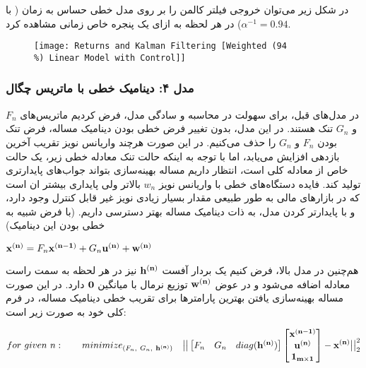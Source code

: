 \documentclass{scribe-cgenomics}
\begin{document}
\begin{نتیجه}
در شکل زیر می‌توان خروجی فیلتر کالمن را بر روی مدل خطی حساس به زمان ( با
$\alpha^{-1} = 0.94$)
در هر لحظه به ازای یک پنجره خاص زمانی مشاهده کرد.

\begin{figure}[h]
\texttt{[image: Returns and Kalman Filtering [Weighted (94\\\%) Linear Model with Control]]}
\centering
\end{figure}
\end{نتیجه}





\subsubsection{مدل ۴: دینامیک خطی با ماتریس چگال}
در مدل‌های قبل، برای سهولت در محاسبه و سادگی مدل، فرض کردیم ماتریس‌های
$F_n$
و
$G_n$
تنک هستند. در این مدل، بدون تغییر فرض خطی بودن دینامیک مساله، فرض تنک بودن
$F_n$
و
$G_n$
را حذف می‌کنیم. در این صورت هرچند واریانس نویز تقریب آخرین بازدهی افزایش می‌یابد، اما با توجه به اینکه حالت تنک معادله خطی زیر، یک حالت خاص از معادله کلی است، انتظار داریم مساله بهینه‌سازی بتواند جواب‌های پایدارتری تولید کند. فایده دستگاه‌های خطی با واریانس نویز
$w_n$
بالاتر ولی پایداری بیشتر ان است که در بازارهای مالی به طور طبیعی مقدار بسیار زیادی نویز غیر قابل کنترل وجود دارد، و با پایدارتر کردن مدل، به ذات دینامیک مساله بهتر دسترسی داریم. (با فرض شبیه به خطی بودن این دینامیک)

\begin{center}
$
\bold{x^{(n)}} = F_n\bold{x^{(n-1)}} + G_n\bold{u^{(n)}} + \bold{w^{(n)}}
$
\end{center}

هم‌چنین در مدل بالا، فرض کنیم یک بردار آفست
$\bold{h^{(n)}}$
نیز در هر لحظه به سمت راست معادله اضافه می‌شود و در عوض
$\bold{w^{(n)}}$
توزیع نرمال با میانگین
$\bold{0}$
دارد. در این صورت مساله بهینه‌سازی یافتن بهترین پارامترها برای تقریب خطی دینامیک مساله، در فرم کلی خود به صورت زیر است:

\begin{equation}
for\ given\ n:\qquad minimize_{(F_n,\ G_n,\ \bold{h^{(n)}})}\quad \big| \big|
\begin{bmatrix}
F_n & G_n & diag(\bold{h^{(n)}})
\end{bmatrix}
\begin{bmatrix}
\bold{x^{(n-1)}} \\
\bold{u^{(n)}} \\
\bold{1_{m\times 1}}
\end{bmatrix}
- \bold{x^{(n)}}\big|\big|_{2}^{2}
\end{equation}
\end{document}
